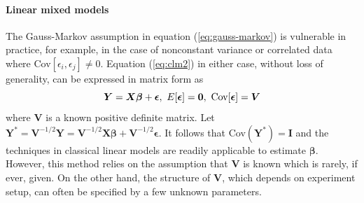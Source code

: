 \paragraph{Linear mixed models}\label{para:lmm}
The Gauss-Markov assumption in equation (\ref{eq:gauss-markov}) is vulnerable in practice, for 
example, in the case of nonconstant variance or correlated data where Cov$[\epsilon_i, 
\epsilon_j]\neq 0$.
Equation (\ref{eq:clm2}) in either case, without loss of generality, can be expressed in matrix
form as
\begin{equation}\label{eq:clm3}
	\bm Y = \bm {X\beta} + \bm \epsilon, ~ E[\bm \epsilon] = \bm 0, ~\text{Cov}[\bm\epsilon] = \bm V
\end{equation}
where $\bm V$ is a known positive definite matrix. Let $\bm Y^{\ast} = \bm V^{-1/2}\bm Y = \bm
V^{-1/2}\bm {X\beta} + \bm V^{-1/2}\bm \epsilon$. It follows that Cov$(\bm Y^{\ast})= \bm I$ and the
techniques in classical linear models are readily applicable to estimate $\bm \beta$. However, this
method relies on the assumption that $\bm V$ is known which is rarely, if ever, given. On the other
hand, the structure of $\bm V$, which depends on experiment setup, can often be specified by a few
unknown parameters. 

